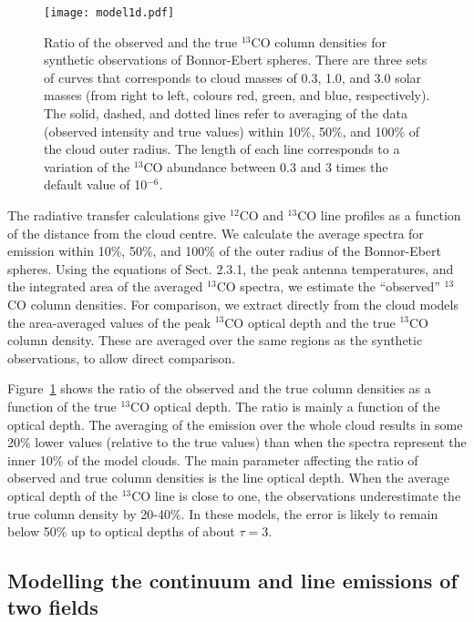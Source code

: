 \documentclass[printer]{aa}
\begin{document}
\begin{appendix}
\begin{figure}[tp]
\texttt{[image: model1d.pdf]}
\caption{
% 
Ratio of the observed and the true $^{13}$CO column densities for
synthetic observations of Bonnor-Ebert spheres. There are three sets
of curves that corresponds to cloud masses of 0.3, 1.0, and 3.0 solar
masses (from right to left, colours red, green, and blue,
respectively). The solid, dashed, and dotted lines refer to averaging
of the data (observed intensity and true values) within 10\%, 50\%,
and 100\% of the cloud outer radius. The length of each line
corresponds to a variation of the $^{13}$CO abundance between 0.3 and
3 times the default value of 10$^{-6}$.
%
}
\label{model11}
\end{figure}

The radiative transfer calculations give $^{12}$CO and $^{13}$CO line
profiles as a function of the distance from the cloud centre. We
calculate the average spectra for emission within 10\%, 50\%, and
100\% of the outer radius of the Bonnor-Ebert spheres. Using the
equations of Sect. 2.3.1, the peak antenna temperatures, and the
integrated area of the averaged $^{13}$CO spectra, we estimate the
``observed'' $^{13}$CO column densities. For comparison, we extract
directly from the cloud models the area-averaged values of the peak
$^{13}$CO optical depth and the true $^{13}$CO column density. These
are averaged over the same regions as the synthetic observations, to
allow direct comparison.

Figure~\ref{model11} shows the ratio of the observed and the true
column densities as a function of the true $^{13}$CO optical depth.
The ratio is mainly a function of the optical depth. The averaging of
the emission over the whole cloud results in some 20\% lower values
(relative to the true values) than when the spectra represent the
inner 10\% of the model clouds. The main parameter affecting the ratio of observed and true column densities is the line optical depth. When the average optical depth of the $^{13}$CO line is close to one, the observations
underestimate the true column density by 20-40\%. In these models, the
error is likely to remain below 50\% up to optical depths of about
$\tau=3$.

\subsection{Modelling the continuum and line emissions of two fields}

\label{modeling2}


\end{appendix}
\end{document}
